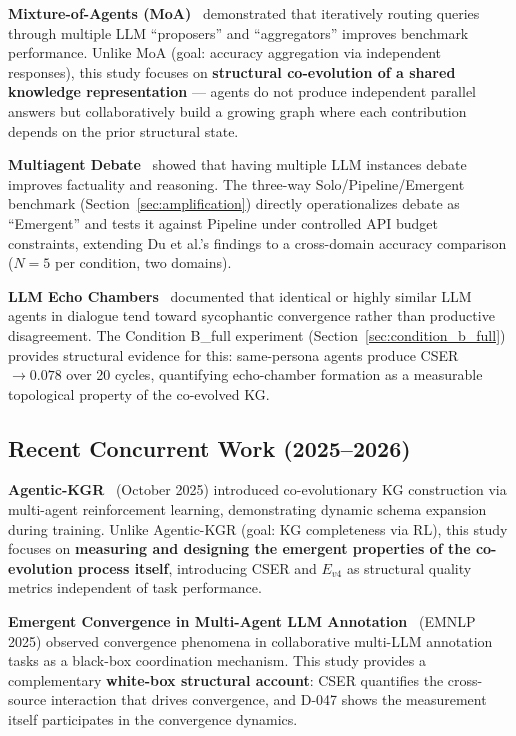 \documentclass[12pt]{article}
\begin{document}
\textbf{Mixture-of-Agents (MoA)}~\cite{wang2024moa} demonstrated that iteratively
routing queries through multiple LLM ``proposers'' and ``aggregators'' improves
benchmark performance. Unlike MoA (goal: accuracy aggregation via independent
responses), this study focuses on \textbf{structural co-evolution of a shared
knowledge representation} --- agents do not produce independent parallel answers
but collaboratively build a growing graph where each contribution depends on
the prior structural state.

\textbf{Multiagent Debate}~\cite{du2023debate} showed that having multiple LLM
instances debate improves factuality and reasoning. The three-way
Solo/Pipeline/Emergent benchmark (Section~\ref{sec:amplification}) directly
operationalizes debate as ``Emergent'' and tests it against Pipeline under
controlled API budget constraints, extending Du et al.'s findings to a
cross-domain accuracy comparison ($N=5$ per condition, two domains).

\textbf{LLM Echo Chambers}~\cite{bail2024echo,sunstein2009extremes} documented that identical or
highly similar LLM agents in dialogue tend toward sycophantic convergence rather
than productive disagreement. The Condition B\_full experiment (Section~\ref{sec:condition_b_full})
provides structural evidence for this: same-persona agents produce
CSER $\to 0.078$ over 20 cycles, quantifying echo-chamber formation as
a measurable topological property of the co-evolved KG.

\subsection{Recent Concurrent Work (2025--2026)}

\textbf{Agentic-KGR}~\cite{li2025agentickgr} (October 2025) introduced co-evolutionary
KG construction via multi-agent reinforcement learning, demonstrating dynamic schema
expansion during training. Unlike Agentic-KGR (goal: KG completeness via RL),
this study focuses on \textbf{measuring and designing the emergent properties of
the co-evolution process itself}, introducing CSER and $E_{v4}$ as structural
quality metrics independent of task performance.

\textbf{Emergent Convergence in Multi-Agent LLM Annotation}~\cite{parfenova2025emergent}
(EMNLP 2025) observed convergence phenomena in collaborative multi-LLM annotation
tasks as a black-box coordination mechanism. This study provides a complementary
\textbf{white-box structural account}: CSER quantifies the cross-source interaction
that drives convergence, and D-047 shows the measurement itself participates in the
convergence dynamics.
\end{document}
